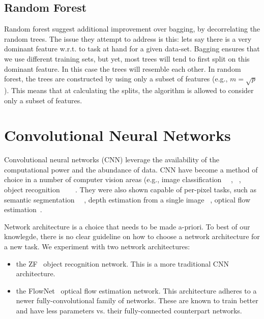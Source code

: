 \subsection{Random Forest}
Random forest suggest additional improvement over bagging, by
decorrelating the random trees.  The issue they attempt to address is
this: lets say there is a very dominant feature w.r.t. to task at hand
for a given data-set.  Bagging ensures that we use different training
sets, but yet, most trees will tend to first split on this dominant
feature.  In this case the trees will resemble each other.  In random
forest, the trees are constructed by using only a subset of features
(e.g., $m = \sqrt{p}$).  This means that at calculating the splits,
the algorithm is allowed to consider only a subset of features.

\section{Convolutional Neural Networks}

Convolutional neural networks (CNN) leverage the availability of the
computational power and the abundance of data.  CNN have become a
method of choice in a number of computer vision areas (e.g., image
classification~\cite{krizhevsky2012imagenet} ~\cite{simonyan2014very},
~\cite{szegedy2015going}, object recognition
~\cite{sermanet2013overfeat}~\cite{girshick2014rich}
~\cite{he2014spatial}.  They were also shown capable of per-pixel
tasks, such as semantic segmentation
~\cite{ning2005toward}~\cite{gupta2014learning}, depth estimation from
a single image ~\cite{liu2016learning}, optical flow
estimation~\cite{fischer2015flownet}.

Network architecture is a choice that needs to be made a-priori.  To
best of our knowlegde, there is no clear guideline on how to choose a
network architecture for a new task.  We experiment with two network architectures:

\begin{itemize}
\item the ZF~\cite{DBLP:journals/corr/ZeilerF13} object recognition
  network.  This is a more traditional CNN architecture.
\item the FlowNet~\cite{fischer2015flownet} optical flow estimation
  network.  This architecture adheres to a newer fully-convolutional
  family of networks.  These are known to train better and have less
  parameters vs. their fully-connected counterpart networks.
\end{itemize}

